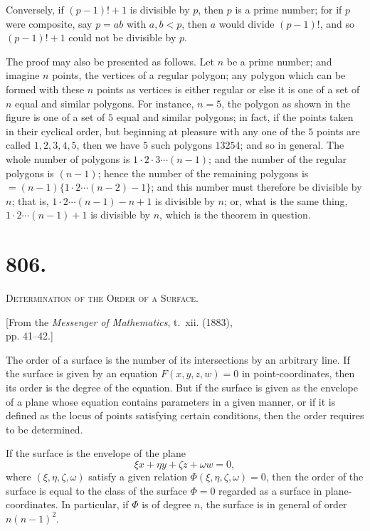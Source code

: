 \documentclass[11pt,a4paper]{article}
\theoremstyle{definition}
\theoremstyle{remark}
\begin{document}
Conversely, if $(p-1)! + 1$ is divisible by $p$, then $p$ is a prime number; for if $p$ were composite, say $p = ab$ with $a, b < p$, then $a$ would divide $(p-1)!$, and so $(p-1)! + 1$ could not be divisible by $p$.

The proof may also be presented as follows. Let $n$ be a prime number; and imagine $n$ points, the vertices of a regular polygon; any polygon which can be formed with these $n$ points as vertices is either regular or else it is one of a set of $n$ equal and similar polygons. For instance, $n = 5$, the polygon as shown in the figure is one of a set of $5$ equal and similar polygons; in fact, if the points taken in their cyclical order, but beginning at pleasure with any one of the $5$ points are called $1, 2, 3, 4, 5$, then we have $5$ such polygons $13254$; and so in general. The whole number of polygons is $1 \cdot 2 \cdot 3 \cdots (n-1)$; and the number of the regular polygons is $(n-1)$; hence the number of the remaining polygons is $= (n - 1) \{1 \cdot 2 \cdots (n-2) - 1\}$; and this number must therefore be divisible by $n$; that is, $1 \cdot 2 \cdots (n-1) - n + 1$ is divisible by $n$; or, what is the same thing, $1 \cdot 2 \cdots (n-1) + 1$ is divisible by $n$, which is the theorem in question.



\newpage
\section*{806.}
\begin{center}
{\large\scshape Determination of the Order of a Surface.}
\end{center}

\begin{flushright}
\small[From the \textit{Messenger of Mathematics}, t.~xii. (1883),\\
pp. 41--42.]
\end{flushright}

The order of a surface is the number of its intersections by an arbitrary line. If the surface is given by an equation $F(x, y, z, w) = 0$ in point-coordinates, then its order is the degree of the equation. But if the surface is given as the envelope of a plane whose equation contains parameters in a given manner, or if it is defined as the locus of points satisfying certain conditions, then the order requires to be determined.

If the surface is the envelope of the plane
\[
\xi x + \eta y + \zeta z + \omega w = 0,
\]
where $(\xi, \eta, \zeta, \omega)$ satisfy a given relation $\Phi(\xi, \eta, \zeta, \omega) = 0$, then the order of the surface is equal to the class of the surface $\Phi = 0$ regarded as a surface in plane-coordinates. In particular, if $\Phi$ is of degree $n$, the surface is in general of order $n(n-1)^2$.
\end{document}
